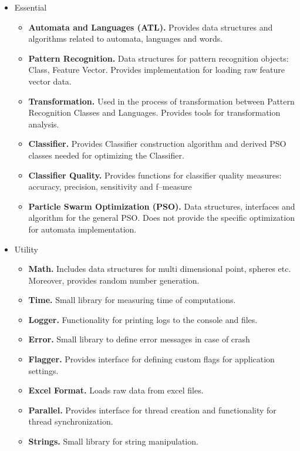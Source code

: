 \documentclass{mini}
\begin{document}
\begin{itemize}
    \item Essential
    \begin{itemize}
        \item {\bf Automata and Languages (ATL).} Provides data structures and algorithms related to automata, languages and words.
        \item {\bf Pattern Recognition.} Data structures for pattern recognition objects: Class, Feature Vector. Provides implementation for loading raw feature vector data.
        \item {\bf Transformation.} Used in the process of transformation between Pattern Recognition Classes and Languages. Provides tools for transformation analysis.
        \item {\bf Classifier.} Provides Classifier construction algorithm and derived PSO classes needed for optimizing the Classifier.
        \item {\bf Classifier Quality.} Provides functions for classifier quality measures: accuracy, precision, sensitivity and f--measure
        \item {\bf Particle Swarm Optimization (PSO).} Data structures, interfaces and algorithm for the general PSO. Does not provide the specific optimization for automata implementation.
    \end{itemize}

    \item Utility
    \begin{itemize}
        \item {\bf Math.} Includes data structures for multi dimensional point, spheres etc. Moreover, provides random number generation.
        \item {\bf Time.} Small library for measuring time of computations.
        \item {\bf Logger.} Functionality for printing logs to the console and files.
        \item {\bf Error.} Small library to define error messages in case of crash
        \item {\bf Flagger.} Provides interface for defining custom flags for application settings.
        \item {\bf Excel Format.} Loads raw data from excel files.
        \item {\bf Parallel.} Provides interface for thread creation and functionality for thread synchronization.
        \item {\bf Strings.} Small library for string manipulation.
    \end{itemize}
\end{itemize}
\end{document}
